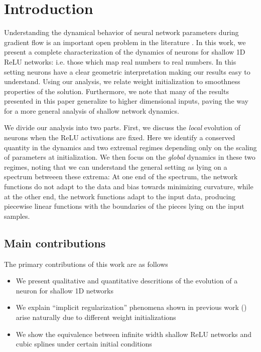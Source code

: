 \section{Introduction}

Understanding the dynamical behavior of neural network parameters during gradient flow is an important open problem in the literature . In this work, we present a complete characterization of the dynamics of neurons for shallow 1D ReLU networks: i.e. those which map real numbers to real numbers. In this setting neurons have a clear geometric interpretation making our results easy to understand. Using our analysis, we relate weight initialization to smoothness properties of the solution. Furthermore, we note that many of the results presented in this paper generalize to higher dimensional inputs, paving the way for a more general analysis of shallow network dynamics.

We divide our analysis into two parts. First, we discuss the \emph{local} evolution of neurons when the ReLU activations are fixed. Here we identify a conserved quantity in the dynamics and two extremal regimes depending only on the scaling of parameters at initialization. We then focus on the \emph{global} dynamics in these two regimes, noting that we can understand the general setting as lying on a spectrum betweeen these extrema: At one end of the spectrum, the network functions do not adapt to the data and bias towards minimizing curvature, while at the other end, the network functions adapt to the input data, producing piecewise linear functions with the boundaries of the pieces lying on the input samples. 


\subsection{Main contributions}
The primary contributions of this work are as follows
\begin{itemize}
    \item We present qualitative and quantitative descritions of the evolution of a neuron for shallow 1D networks
    \item We explain ``implicit regularization'' phenomena shown in previous work () arise naturally due to different weight initializations
    \item We show the equivalence between infinite width shallow ReLU networks and cubic splines under certain initial conditions
\end{itemize}

